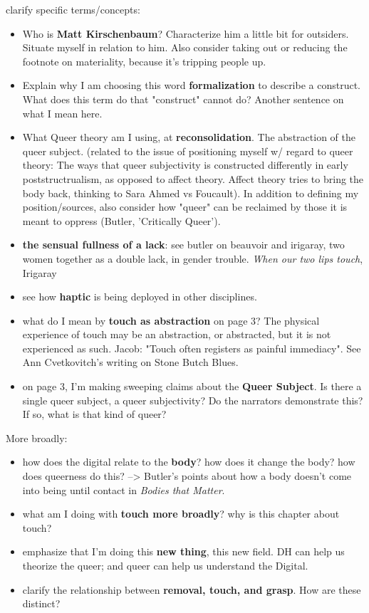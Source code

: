 \documentclass[11pt]{article}
\begin{document}
\begin{enumerate}
clarify specific terms/concepts: 
\begin{itemize}
\item Who is \textbf{\textbf{Matt Kirschenbaum}}? Characterize him a little bit for
outsiders. Situate myself in relation to him. Also consider taking
out or reducing the footnote on materiality, because it's tripping
people up.
\item Explain why I am choosing this word \textbf{\textbf{formalization}} to describe a
construct. What does this term do that "construct" cannot do?
Another sentence on what I mean here.
\item What Queer theory am I using, at \textbf{\textbf{reconsolidation}}. The
abstraction of the queer subject. (related to the issue of
positioning myself w/ regard to queer theory: The ways that queer
subjectivity is constructed differently in early poststructrualism,
as opposed to affect theory. Affect theory tries to bring the body
back, thinking to Sara Ahmed vs Foucault). In addition to defining
my position/sources, also consider how "queer" can be reclaimed by
those it is meant to oppress (Butler, 'Critically Queer').
\item \textbf{\textbf{the sensual fullness of a lack}}: see butler on beauvoir and
irigaray, two women together as a double lack, in gender
trouble. \emph{When our two lips touch}, Irigaray
\item see how \textbf{\textbf{haptic}} is being deployed in other disciplines.
\item what do I mean by \textbf{\textbf{touch as abstraction}} on page 3? The physical
experience of touch may be an abstraction, or abstracted, but it is
not experienced as such. Jacob: "Touch often registers as painful
immediacy". See Ann Cvetkovitch's writing on Stone Butch Blues.
\item on page 3, I'm making sweeping claims about the \textbf{\textbf{Queer
Subject}}. Is there a single queer subject, a queer subjectivity? Do
the narrators demonstrate this? If so, what is that kind of queer?
\end{itemize}

More broadly: 
\begin{itemize}
\item how does the digital relate to the \textbf{\textbf{body}}? how does it change the
body? how does queerness do this? --> Butler's points about how a
body doesn't come into being until contact in \emph{Bodies that Matter}.
\item what am I doing with \textbf{\textbf{touch more broadly}}? why is this chapter
about touch?
\item emphasize that I'm doing this \textbf{\textbf{new thing}}, this new field. DH can
help us theorize the queer; and queer can help us understand the
Digital.
\item clarify the relationship between \textbf{\textbf{removal, touch, and grasp}}. How
are these distinct?
\end{itemize}


\end{enumerate}
\end{document}
